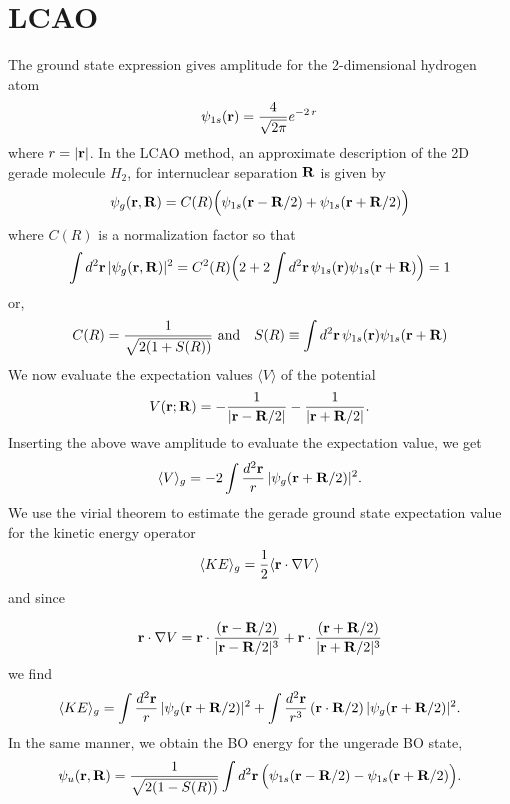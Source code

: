 \section{LCAO}
The ground state expression gives amplitude for the 2-dimensional hydrogen atom \cite{YangXL}
\begin{equation}
\psi_{1s}({\bf r}) =\frac{4}{\sqrt{2 \pi}}e^{-2 \, r}
\end{equation}
where $ r = |{\bf r}|$. In the LCAO method, an approximate description of the 2D gerade molecule $H_{2} $, for internuclear separation ${\bf R}$ is given by
\begin{equation}
\psi_{g}({\bf r},{\bf R}) = C(R) \Bigl ( \psi_{1s}({\bf r}-{\bf R}/2 ) + \psi_{1s}({\bf r}+{\bf R}/2 ) \Bigr )
\end{equation}
where $C(R)$ is a normalization factor so that
\begin{equation}
\int d^2 {\bf r} \, |\psi_{g}({\bf r},{\bf R})|^2 = C^2(R) \Bigl (
2 + 2 \int d^2 {\bf r} \, \psi_{1s}({\bf r}) \psi_{1s}({\bf r}+{\bf R}) \Bigr ) =1
\end{equation}
or,
\begin{equation}
  C(R) = \frac{1}{\sqrt{2 (1+ S(R) )}} \text{   and} \quad S(R) \equiv \int d^2 {\bf r} \, \psi_{1s}({\bf r}) \psi_{1s}({\bf r}+{\bf R}) \label{eq:soverlap}
\end{equation}
We now evaluate the expectation values $ \langle V \rangle $ of
the potential
\begin{equation}
  V({\bf r} ; {\bf R}) =  -\frac{1}{|{\bf r} - {\bf R}/2|} - \frac{1}{|{\bf r} + {\bf R}/2|}.
\end{equation}
Inserting the above wave amplitude to evaluate the expectation value, we get
\begin{equation}
\langle V \rangle_{g} =
-2 \int \frac{d^2 {\bf r}}{r} \, |\psi_{g}({\bf r}+{\bf R}/2 )|^2.
\end{equation}
We use the virial theorem to estimate the gerade ground state expectation value for the kinetic energy operator
\begin{equation}
\langle KE \rangle_{g} = \frac{1}{2} \langle {\bf r} \cdot {\bf \nabla} V \rangle
\end{equation}
and since

\begin{equation}
{\bf r} \cdot {\bf \nabla} V  = {\bf r}\cdot \frac{( {\bf r}- {\bf R}/2) }{ |{\bf r}- {\bf R}/2 |^{3} } + {\bf r}\cdot \frac{( {\bf r}+ {\bf R}/2) }{ |{\bf r}+ {\bf R}/2 |^{3} }
\end{equation}
we find
\begin{equation}
\langle KE \rangle_{g} =
 \int \frac{d^2 {\bf r}}{r} \, |\psi_{g}({\bf r}+{\bf R}/2 )|^2
+ \int \frac{d^2 {\bf r}}{r^3} \, ({\bf r}\cdot{\bf R}/2) \,
|\psi_{g}({\bf r}+{\bf R}/2 )|^2 .
\end{equation}
In the same manner, we obtain the BO energy for the ungerade BO state,
\begin{equation}
\psi_{u}({\bf r},{\bf R}) =\frac{1}{\sqrt{2 (1- S(R) )}}\int d^2 {\bf r} \, \Bigl ( \psi_{1s}({\bf r}-{\bf R}/2 ) - \psi_{1s}({\bf r}+{\bf R}/2 ) \Bigr ).
\end{equation}

